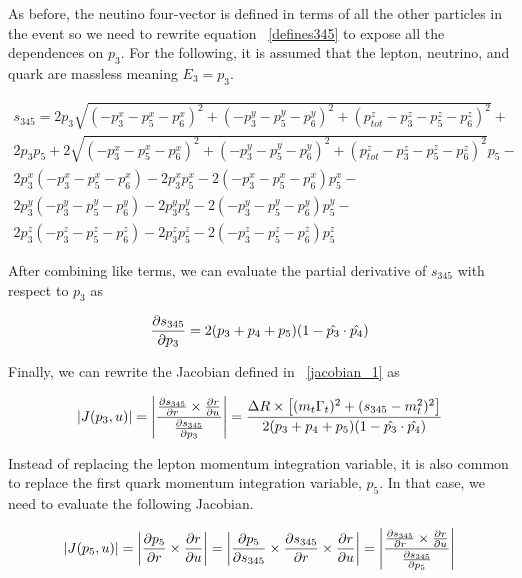 As before, the neutino four-vector is defined in terms of all the other particles in
the event so we need to rewrite equation ~\ref{defines345} to expose all the
dependences on $p_{3}$. For the following, it is assumed that the lepton,
neutrino, and quark are massless meaning $E_{3} = p_{3}$.

\begin{eqnarray}
\label{defines345_2}
\nonumber
s_{345} = 2p_{3}\sqrt{(-p_{3}^{x} -p_{5}^{x} -p_{6}^{x})^{2} + (-p_{3}^{y}
-p_{5}^{y} -p_{6}^{y})^{2} + (p_{tot}^{z} -p_{3}^{z} -p_{5}^{z} -p_{6}^{z})^{2}}
+ \\
\nonumber
2p_{3}p_{5} + 2\sqrt{(-p_{3}^{x} -p_{5}^{x} -p_{6}^{x})^{2} + (-p_{3}^{y} -p_{5}^{y}
-p_{6}^{y})^{2} + (p_{tot}^{z} -p_{3}^{z} -p_{5}^{z} -p_{6}^{z})^{2}}p_{5} - \\
\nonumber
2p_{3}^{x}(-p_{3}^{x} -p_{5}^{x} -p_{6}^{x}) - 2p_{3}^{x}p_{5}^{x} -
2(-p_{3}^{x} -p_{5}^{x} -p_{6}^{x})p_{5}^{x} - \\
\nonumber
2p_{3}^{y}(-p_{3}^{y} -p_{5}^{y} -p_{6}^{y}) - 2p_{3}^{y}p_{5}^{y} -
2(-p_{3}^{y} -p_{5}^{y} -p_{6}^{y})p_{5}^{y} - \\
2p_{3}^{z}(-p_{3}^{z} -p_{5}^{z} -p_{6}^{z}) - 2p_{3}^{z}p_{5}^{z} - 2(-p_{3}^{z} -p_{5}^{z} -p_{6}^{z})p_{5}^{z}
\end{eqnarray}

After combining like terms, we can evaluate the partial derivative of $s_{345}$
with respect to $p_{3}$ as

\begin{equation}
\label{ds345dp3}
\frac{\partial s_{345}}{\partial p_{3}} = 2(p_{3} + p_{4} + p_{5})(1 - \hat{p_{3}} \cdot \hat{p_{4}})
\end{equation}

Finally, we can rewrite the Jacobian defined in ~\ref{jacobian_1} as

\begin{equation}
\label{jacobian_2}
|J(p_{3}, u)| = \left | \frac{\frac{\partial s_{345}}{\partial r} \times
\frac{\partial r}{\partial u}}{\frac{\partial s_{345}}{\partial p_{3}}} \right | = \frac{\Delta R \times \left[
(m_{t}\Gamma_{t})^{2} + (s_{345} - m_{t}^{2})^{2} \right]}{2(p_{3} + p_{4} + p_{5})(1 - \hat{p_{3}} \cdot \hat{p_{4}})}
\end{equation}


Instead of replacing the lepton momentum integration variable, it is also common
to replace the first quark momentum integration variable, $p_{5}$. In that case,
we need to evaluate the following Jacobian.

\begin{equation}
\label{jacobian_3}
|J(p_{5}, u)| = \left| \frac{\partial p_{5}}{\partial r} \times \frac{\partial r}{\partial u} \right| = \left|
\frac{\partial p_{5}}{\partial s_{345}} \times \frac{\partial s_{345}}{\partial r} \times \frac{\partial r}{\partial u} \right| =
\left | \frac{\frac{\partial s_{345}}{\partial r} \times
\frac{\partial r}{\partial u}}{\frac{\partial s_{345}}{\partial p_{5}}} \right |
\end{equation}

